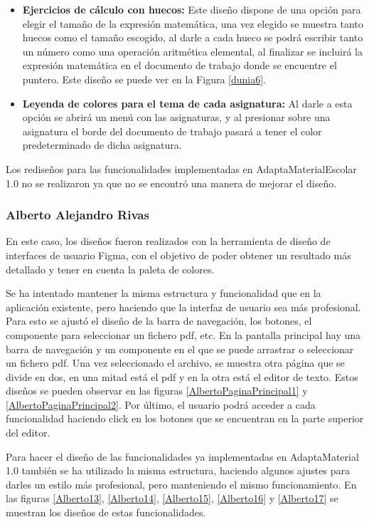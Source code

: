 \begin{itemize}
  \item  \textbf{Ejercicios de cálculo con huecos:} Este diseño dispone de una opción para elegir el tamaño de la expresión matemática, una vez elegido se muestra tanto huecos como el tamaño escogido, al darle a cada hueco se podrá escribir tanto un número como una operación aritmética elemental, al finalizar se incluirá la expresión matemática en el documento de trabajo donde se encuentre el puntero. Este diseño se puede ver en la Figura \ref{dunia6}.
  \item  \textbf{Leyenda de colores para el tema de cada asignatura:} Al darle a esta opción se abrirá un menú con las asignaturas, y al presionar sobre una asignatura el borde del documento de trabajo pasará a tener el color predeterminado de dicha asignatura.
\end{itemize}

Los rediseños para las funcionalidades implementadas en AdaptaMaterialEscolar 1.0 no se realizaron ya que no se encontró una manera de mejorar el diseño.

\subsubsection{Alberto Alejandro Rivas}
\label{sec:albertoIter}
En este caso, los diseños fueron realizados con la herramienta de diseño de interfaces de usuario Figma, con el objetivo de poder obtener un resultado más detallado y tener en cuenta la paleta de colores.

Se ha intentado mantener la misma estructura y funcionalidad que en la aplicación existente, pero haciendo que la interfaz de usuario sea más profesional. Para esto se ajustó el diseño de la barra de navegación, los botones, el componente para seleccionar un fichero pdf, etc. En la pantalla principal hay una barra de navegación y un componente en el que se puede arrastrar o seleccionar un fichero pdf. Una vez seleccionado el archivo, se muestra otra página que se divide en dos, en una mitad está el pdf y en la otra está el editor de texto. Estos diseños se pueden observar en las figuras \ref{AlbertoPaginaPrincipal1} y \ref{AlbertoPaginaPrincipal2}. Por último, el usuario podrá acceder a cada funcionalidad haciendo click en los botones que se encuentran en la parte superior del editor.

Para hacer el diseño de las funcionalidades ya implementadas en AdaptaMaterial 1.0 también se ha utilizado la misma estructura, haciendo algunos ajustes para darles un estilo más profesional, pero manteniendo el mismo funcionamiento. En las figuras \ref{Alberto13}, \ref{Alberto14}, \ref{Alberto15}, \ref{Alberto16} y \ref{Alberto17} se muestran los diseños de estas funcionalidades.

